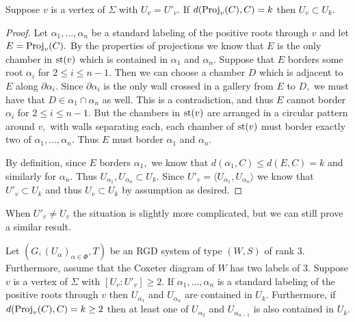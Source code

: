 \documentclass[class=book, crop=false]{standalone}
\begin{document}
\begin{lemma}
	\label{lem:deg3fg}
	Suppose $v$ is a vertex of $\Sigma$ with $U_v=U'_v.$ If $d(\mathrm{Proj}_v(C),C)=k$ then $U_v\subset U_k.$
\end{lemma}
\begin{proof}
	Let $\alpha_1,\dots,\alpha_n$ be a standard labeling of the positive roots through $v$ and let $E=\mathrm{Proj}_v(C).$ By the properties of projections we know that $E$ is the only chamber in $\mathrm{st}(v)$ which is contained in $\alpha_1$ and $\alpha_n.$ Suppose that $E$ borders some root $\alpha_i$ for $2\le i\le n-1.$ Then we can choose a chamber $D$ which is adjacent to $E$ along $\partial\alpha_i.$ Since $\partial \alpha_i$ is the only wall crossed in a gallery from $E$ to $D,$ we must have that $D\in \alpha_1\cap \alpha_n$ as well. This is a contradiction, and thus $E$ cannot border $\alpha_i$ for $2\le i\le n-1.$ But the chambers in $\mathrm{st}(v)$ are arranged in a circular pattern around $v,$ with walls separating each, each chamber of $\mathrm{st}(v)$ must border exactly two of $\alpha_1,\dots,\alpha_n.$ Thus $E$ must border $\alpha_1$ and $\alpha_n.$

	By definition, since $E$ borders $\alpha_1,$ we know that $d(\alpha_1,C)\le d(E,C)=k$ and similarly for $\alpha_n.$ Thus $U_{\alpha_1},U_{\alpha_n}\subset U_k.$ Since $U'_v=\langle U_{\alpha_1},U_{\alpha_n}\rangle$ we know that $U'_v\subset U_k$ and thus $U_v\subset U_k$ by assumption as desired.
\end{proof}
When $U'_v\neq U_v$ the situation is slightly more complicated, but we can still prove a similar result.
\begin{lemma}
	\label{lem:exdegfg}
	Let $(G,(U_\alpha)_{\alpha\in \Phi},T)$ be an RGD system of type $(W,S)$ of rank $3.$ Furthermore, assume that the Coxeter diagram of $W$ has two labels of $3.$ Suppose $v$ is a vertex of $\Sigma$ with $[U_v:U'_v]\ge 2.$ If $\alpha_1,\dots,\alpha_n$ is a standard labeling of the positive roots through $v$ then $U_{\alpha_1}$ and $U_{\alpha_n}$ are contained in $U_k.$ Furthermore, if $d(\mathrm{Proj}_v(C),C)=k\ge 2$ then at least one of $U_{\alpha_2}$ and $U_{\alpha_{n-1}}$ is also contained in $U_k.$
\end{lemma}
\end{document}
